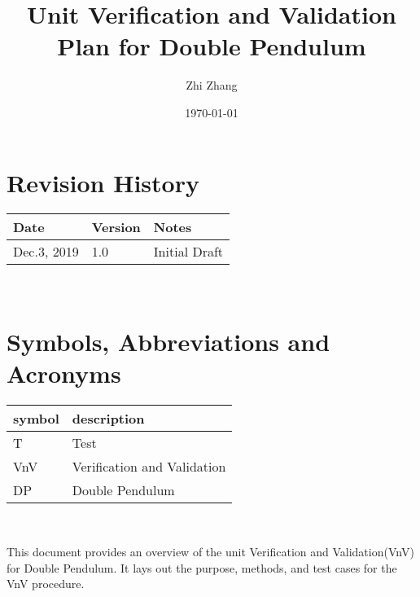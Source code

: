 \documentclass[12pt, titlepage]{article}
\begin{document}
\title{Unit Verification and Validation Plan for Double Pendulum} 
\author{Zhi Zhang}
\date{\today}
	
\maketitle


\section{Revision History}

\begin{tabularx}{\textwidth}{p{3cm}p{2cm}X}
\toprule {\bf Date} & {\bf Version} & {\bf Notes}\\
\midrule
Dec.3, 2019 & 1.0 & Initial Draft\\
\bottomrule
\end{tabularx}

~\newpage

\tableofcontents





\newpage

\section{Symbols, Abbreviations and Acronyms}

\renewcommand{\arraystretch}{1.2}
\begin{tabular}{l l} 
  \toprule		
  \textbf{symbol} & \textbf{description}\\
  \midrule 
  T & Test\\
  VnV & Verification and Validation\\
  DP & Double Pendulum\\
  \bottomrule
\end{tabular}\\


\newpage


This document provides an overview of the unit Verification and Validation(VnV) for Double Pendulum. It  lays out the purpose, methods, and test cases for the VnV procedure. 
\end{document}
